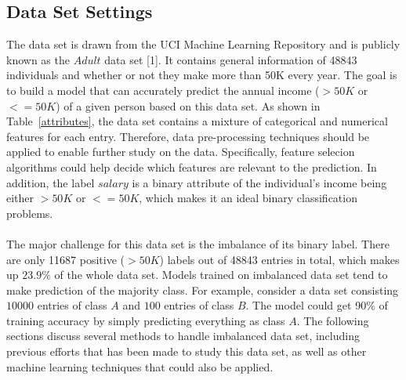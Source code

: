 \documentclass{article}
\begin{document}
\subsection{Data Set Settings}
The data set is drawn from the UCI Machine Learning Repository and is publicly known as the $Adult$ data set [1]. It contains general information of 48843 individuals and whether or not they make more than 50K every year. The goal is to build a model that can accurately predict the annual income ($>50K$ or $<=50K$) of a given person based on this data set. As shown in Table~\ref{attributes}, the data set contains a mixture of categorical and numerical features for each entry. Therefore, data pre-processing techniques should be applied to enable further study on the data. Specifically, feature selecion algorithms could help decide which features are relevant to the prediction. In addition, the label $salary$ is a binary attribute of the individual's income being either $>50K$ or $<=50K$, which makes it an ideal binary classification problems.\\\\
The major challenge for this data set is the imbalance of its binary label. There are only 11687 positive ($>50K$) labels out of 48843 entries in total, which makes up $23.9\%$ of the whole data set. Models trained on imbalanced data set tend to make prediction of the majority class. For example, consider a data set consisting $10000$ entries of class $A$ and $100$ entries of class $B$. The model could get 90\% of training accuracy by simply predicting everything as class $A$. The following sections discuss several methods to handle imbalanced data set, including previous efforts that has been made to study this data set, as well as other machine learning techniques that could also be applied.
\end{document}
